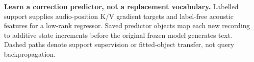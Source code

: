 \caption{\textbf{Learn a correction predictor, not a replacement vocabulary.}
Labelled support supplies audio-position K/V gradient targets and
label-free acoustic features for a low-rank regressor. Saved predictor
objects map each new recording to additive state increments before
the original frozen model generates text. Dashed paths denote support
supervision or fitted-object transfer, not query backpropagation.}
